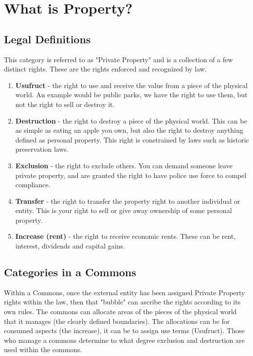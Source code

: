 	\section{What is Property?}
\subsection{ Legal Definitions}

This category is referred to as "Private Property" and is a collection of a few distinct rights. These are the rights enforced and recognized by law. 

\begin{enumerate}
	
	\item \textbf{Usufruct} - the right to use and receive the value from a piece of the physical world. An example would be public parks, we have the right to use them, but not the right to sell or destroy it.
	
	\item \textbf{Destruction} - the right to destroy a piece of the physical world. This can be as simple as eating an apple you own, but also the right to destroy anything defined as personal property. This right is constrained by laws such as historic preservation laws. 
	
	\item \textbf{Exclusion} -  the right to exclude others. You can demand someone leave private property, and are granted the right to have police use force to compel compliance. 
	
	\item \textbf{Transfer} - the right to transfer the property right to another individual or entity. This is your right to sell or give away ownership of some personal property. 
	
	\item \textbf{Increase (rent)} - the right to receive economic rents. These can be rent, interest, dividends and capital gains. 
\end{enumerate}



\subsection{Categories in a Commons}

Within a Commons, once the external entity has been assigned Private Property rights within the law, then that "bubble" can ascribe the rights according to its own rules. The commons can allocate areas of the pieces of the physical world that it manages (the clearly defined boundaries). The allocations can be for consumed aspects (the increase), it can be to assign use terms (Usufruct). Those who manage a commons determine to what degree exclusion and destruction are used within the commons.


